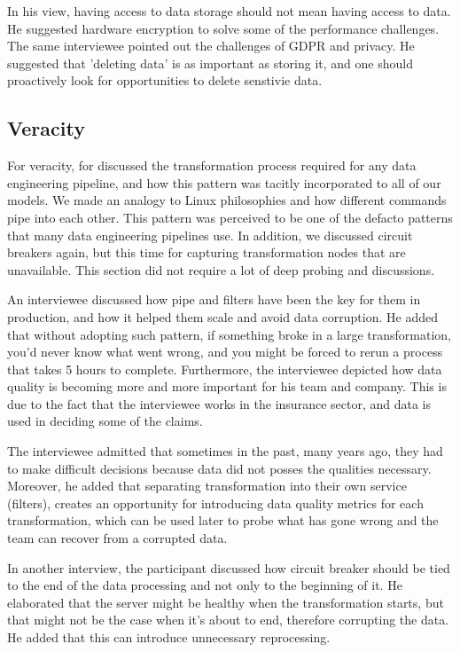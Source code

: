\documentclass{bmcart}
\begin{document}
In his view, having access to data storage should not mean having access to data. He suggested hardware encryption to solve some of the performance challenges. The same interviewee pointed out the challenges of GDPR and privacy. He suggested that 'deleting data' is as important as storing it, and one should proactively look for opportunities to delete senstivie data. 


\subsection{Veracity}

For veracity, for discussed the transformation process required for any data engineering pipeline, and how this pattern was tacitly incorporated to all of our models. We made an analogy to Linux philosophies and how different commands pipe into each other. This pattern was perceived to be one of the defacto patterns that many data engineering pipelines use. In addition, we discussed circuit breakers again, but this time for capturing transformation nodes that are unavailable. This section did not require a lot of deep probing and discussions. 


An interviewee discussed how pipe and filters have been the key for them in production, and how it helped them scale and avoid data corruption. He added that without adopting such pattern, if something broke in a large transformation, you'd never know what went wrong, and you might be forced to rerun a process that takes 5 hours to complete. Furthermore, the interviewee depicted how data quality is becoming more and more important for his team and company. This is due to the fact that the interviewee works in the insurance sector, and data is used in deciding some of the claims. 

The interviewee admitted that sometimes in the past, many years ago, they had to make difficult decisions because data did not posses the qualities necessary. Moreover, he added that separating transformation into their own service (filters), creates an opportunity for introducing data quality metrics for each transformation, which can be used later to probe what has gone wrong and the team can recover from a corrupted data.

In another interview, the participant discussed how circuit breaker should be tied to the end of the data processing and not only to the beginning of it. He elaborated that the server might be healthy when the transformation starts, but that might not be the case when it's about to end, therefore corrupting the data. He added that this can introduce unnecessary reprocessing. 
\end{document}
